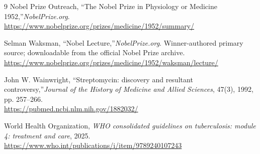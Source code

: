 \begin{thebibliography}{9}
Nobel Prize Outreach, ``The Nobel Prize in Physiology or Medicine 1952,''\emph{NobelPrize.org}.\\
\url{https://www.nobelprize.org/prizes/medicine/1952/summary/}

Selman Waksman, ``Nobel Lecture,''\emph{NobelPrize.org}. Winner-authored primary source; downloadable from the official Nobel Prize archive.\\
\url{https://www.nobelprize.org/prizes/medicine/1952/waksman/lecture/}

John W. Wainwright, ``Streptomycin: discovery and resultant controversy,''\emph{Journal of the History of Medicine and Allied Sciences}, 47(3), 1992, pp. 257--266.\\
\url{https://pubmed.ncbi.nlm.nih.gov/1882032/}

World Health Organization, \emph{WHO consolidated guidelines on tuberculosis: module 4: treatment and care}, 2025.\\
\url{https://www.who.int/publications/i/item/9789240107243}
\end{thebibliography}
